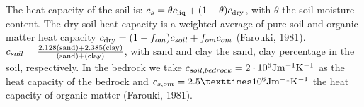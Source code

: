 \documentclass{article}
\begin{document}
The heat capacity of the soil is:
$c_s=\theta c_{\rm liq} + (1-\theta) c_{\rm dry}$, with $\theta$ the soil moisture content.
The dry soil heat capacity is a weighted average of pure soil and organic matter heat capacity $c_{\rm dry} = (1-f_{om})c_{soil} + f_{om}c_{om}$ (Farouki, 1981).
$c_{soil} = {\rm \frac{2.128 (sand)+ 2.385 (clay)}{(sand) + (clay)}}$, with sand and clay the sand, clay percentage in the soil, respectively.
In the bedrock we take $c_{soil,bedrock} = 2 \cdot 10^6 {\rm J m^{-1} K^{-1}}$ as the heat capacity of the bedrock and $c_{s,om} = 2.5 ×10^6 {\rm J m^{-1} K^{-1}}$ the heat capacity of organic matter (Farouki, 1981).

\begin{table}[]
\end{table}
\end{document}
